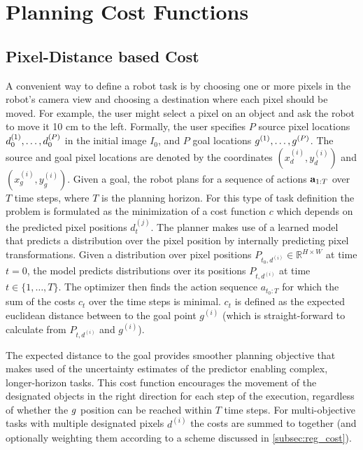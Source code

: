 \section{Planning Cost Functions}


\subsection{Pixel-Distance based Cost}
A convenient way to define a robot task is by choosing one or more pixels in the robot's camera view and choosing a destination where each pixel should be moved. For example, the user might select a pixel on an object and ask the robot to move it 10 cm to the left. Formally, the user specifies $P$ source pixel locations $d_0^{(1)}, \dots, d_0^{(P)}$ in the initial image $I_0$, and $P$ goal locations $g^{(1)}, \dots, g^{(P)}$. The source and goal pixel locations are denoted by the coordinates $(x_d^{(i)}, y_d^{(i)})$ and $(x_g^{(i)}, y_g^{(i)})$. Given a goal, the robot plans for a sequence of actions $\mathbf{a}_{1:T}$ over $T$ time steps, where $T$ is the planning horizon. For this type of task definition the problem is formulated as the minimization of a cost function $c$ which depends on the predicted pixel positions $d_t^{(j)}$. The planner makes use of a learned model that predicts a distribution over the pixel position by internally predicting pixel transformations. Given a distribution over pixel positions $P_{t_0, d^{(i)}}\in\mathbb{R}^{H\times W}$ at time $t = 0$, the model predicts distributions over its positions $P_{t, d^{(i)}}$ at time $t \in \{ 1, \dots, T \}$. The optimizer then finds the action sequence $a_{t_0:T}$ for which the sum of the costs $c_t$ over the time steps is minimal. $c_t$ is defined as the expected euclidean distance between to the goal point $g^{(i)}$ (which is straight-forward to calculate from $P_{t, d^{(i)}}$ and $g^{(i)}$).

The expected distance to the goal provides smoother planning objective that makes used of the uncertainty estimates of the predictor enabling complex, longer-horizon tasks. This cost function encourages the movement of the designated objects in the right direction for each step of the execution, regardless of whether the $g$ position can be reached within $T$ time steps. For multi-objective tasks with multiple designated pixels $d^{(i)}$ the costs are summed to together (and optionally weighting them according to a scheme discussed in \autoref{subsec:reg_cost}).  

